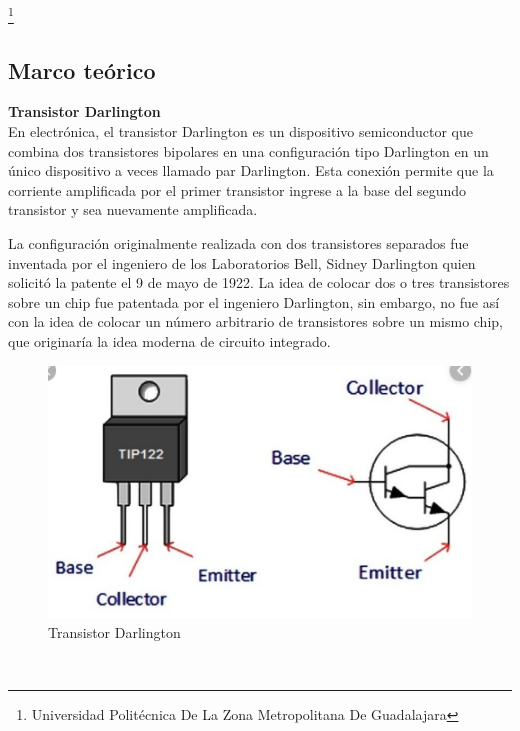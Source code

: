 \documentclass[10pt,a4paper]{article}
\begin{document}
\footnote{Universidad Politécnica De La Zona Metropolitana De Guadalajara} 

\newpage

\subsection*{Marco teórico}
\textbf{Transistor Darlington}\\

En electrónica, el transistor Darlington es un dispositivo semiconductor que combina dos transistores bipolares en una configuración tipo Darlington en un único dispositivo a veces llamado par Darlington. Esta conexión permite que la corriente amplificada por el primer transistor ingrese a la base del segundo transistor y sea nuevamente amplificada.

La configuración originalmente realizada con dos transistores separados fue inventada por el ingeniero de los Laboratorios Bell, Sidney Darlington quien solicitó la patente el 9 de mayo de 1922. La idea de colocar dos o tres transistores sobre un chip fue patentada por el ingeniero Darlington, sin embargo, no fue así con la idea de colocar un número arbitrario de transistores sobre un mismo chip, que originaría la idea moderna de circuito integrado.\\
\begin{figure}[hbtp]
\centering
\includegraphics[scale=0.5]{1.PNG}
\caption{Transistor Darlington }
\end{figure}\\
\end{document}
